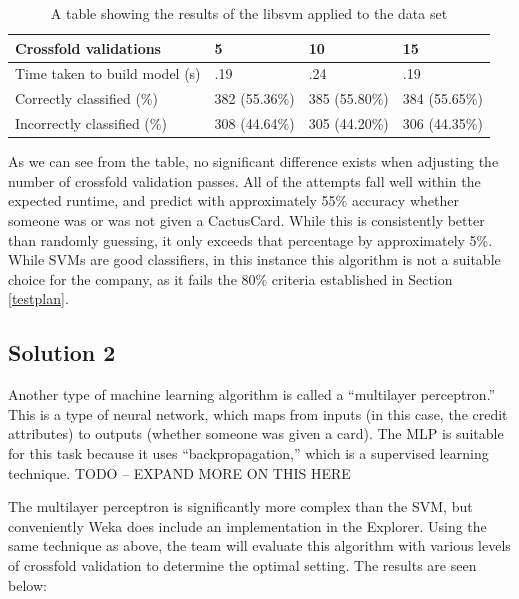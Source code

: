 \documentclass[11pt,journal]{IEEEtran}
\begin{document}
\begin{table}[H]
{\renewcommand{\arraystretch}{1.2}%
\begin{tabular}{ | p{2.5cm} | l | l | l | }
\hline
Crossfold validations         & 5             & 10            & 15            \\ \hline
Time taken to build model (s) & .19           & .24           & .19           \\ \hline
Correctly classified (\%)     & 382 (55.36\%) & 385 (55.80\%) & 384 (55.65\%) \\ \hline
Incorrectly classified (\%)   & 308 (44.64\%) & 305 (44.20\%) & 306 (44.35\%) \\ \hline
\end{tabular}} \quad
\caption{A table showing the results of the libsvm applied to the data set}
\end{table}

As we can see from the table, no significant difference exists when adjusting the number of crossfold validation passes. All of the attempts fall well within the expected runtime, and predict with approximately 55\% accuracy whether someone was or was not given a CactusCard. While this is consistently better than randomly guessing, it only exceeds that percentage by approximately 5\%. While SVMs are good classifiers, in this instance this algorithm is not a suitable choice for the company, as it fails the 80\% criteria established in Section \ref{testplan}.

\subsection{Solution 2}
Another type of machine learning algorithm is called a ``multilayer perceptron.'' This is a type of neural network, which maps from inputs (in this case, the credit attributes) to outputs (whether someone was given a card). The MLP is suitable for this task because it uses ``backpropagation,'' which is a supervised learning technique. TODO -- EXPAND MORE ON THIS HERE
\par
The multilayer perceptron is significantly more complex than the SVM, but conveniently Weka does include an implementation in the Explorer. Using the same technique as above, the team will evaluate this algorithm with various levels of crossfold validation to determine the optimal setting. The results are seen below:
\end{document}
